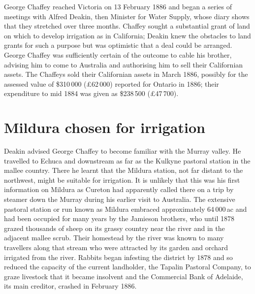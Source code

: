 George Chaffey reached Victoria on 13 February 1886 and began a series
of meetings with Alfred Deakin, then Minister for Water Supply, whose
diary shows that they stretched over three
months.  Chaffey sought a substantial grant of land on
which to develop irrigation as in California; Deakin knew the
obstacles to land grants for such a purpose but was optimistic that a
deal could be arranged.  George Chaffey was sufficiently certain of
the outcome to cable his brother, advising him to come to Australia
and authorising him to sell their Californian assets.  The Chaffeys
sold their Californian assets in March 1886, possibly for the assessed
value of \$310\,000 (\pounds62\,000) reported for Ontario in 1886;
their expenditure to mid 1884 was given as \$238\,500
(\pounds47\,700).

\section*{Mildura chosen for irrigation}

Deakin advised George Chaffey to become familiar with the Murray
valley.  He travelled to Echuca and downstream as far as the Kulkyne
pastoral station in the mallee country.
There he learnt that the Mildura station, not far distant to the
northwest, might be suitable for irrigation.  It is unlikely that this
was his first information on Mildura as Cureton had apparently called
there on a trip by steamer down the Murray during his earlier visit to
Australia.  The extensive pastoral station or run known as Mildura
embraced approximately 64\,000\,ac and had been occupied for many
years by the Jamieson brothers, who until 1878 grazed thousands of
sheep on its grassy country near the river and in the adjacent mallee
scrub.  Their homestead by the
river was known to many travellers along that stream who were
attracted by its garden and orchard irrigated from the river.  Rabbits
began infesting the district by 1878 and so reduced the capacity of
the current landholder, the Tapalin Pastoral Company, to graze
livestock that it became insolvent and the Commercial Bank of
Adelaide, its main creditor, crashed in February 1886.

